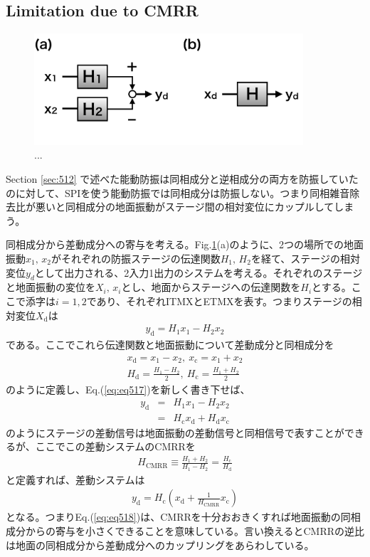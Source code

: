 \subsection{Limitation due to CMRR}
\begin{figure}[h]
  \begin{center}   
    \includegraphics[width=10cm]{./img_chap5/img510.png}
    \caption{...} \label{img:img510}
  \end{center}
\end{figure}
Section \cref{sec:512} で述べた能動防振は同相成分と逆相成分の両方を防振していたのに対して、SPIを使う能動防振では同相成分は防振しない。つまり同相雑音除去比が悪いと同相成分の地面振動がステージ間の相対変位にカップルしてしまう。

同相成分から差動成分への寄与を考える。Fig.\ref{img:img510}(a)のように、2つの場所での地面振動$x_1,\,x_2$がそれぞれの防振ステージの伝達関数$H_1,\,H_2$を経て、ステージの相対変位$y_d$として出力される、2入力1出力のシステムを考える。それぞれのステージと地面振動の変位を$X_{i},\,x_{i}$とし、地面からステージへの伝達関数を$H_{i}$とする。ここで添字は$i=1,2$であり、それぞれITMXとETMXを表す。つまりステージの相対変位$X_{\mathrm{d}}$は
\begin{eqnarray}
  y_{\mathrm{d}} = H_1x_1-H_2x_2 \label{eq:eq517}
\end{eqnarray}
である。ここでこれら伝達関数と地面振動について差動成分と同相成分を
\begin{eqnarray}
  x_{\mathrm{d}} = {x_1-x_2},\ x_{\mathrm{c}} = {x_1+x_2}  \\
  H_{\mathrm{d}} = \frac{H_1-H_2}{2},\ H_{\mathrm{c}} = \frac{H_1+H_2}{2}
\end{eqnarray}
のように定義し、Eq.(\ref{eq:eq517})を新しく書き下せば、
\begin{eqnarray}
  y_{\mathrm{d}} &=& H_1x_1-H_2x_2 \\
  &=& H_{\mathrm{c}}x_{\mathrm{d}} + H_{\mathrm{d}}x_{\mathrm{c}}\label{eq:eq516}
\end{eqnarray}
のようにステージの差動信号は地面振動の差動信号と同相信号で表すことができるが、ここでこの差動システムのCMRRを
\begin{eqnarray}
  H_{\mathrm{CMRR}} \equiv \frac{H_1+H_2}{H_1-H_2}=\frac{H_{\mathrm{c}}}{H_{\mathrm{d}}} \label{eq:eq519}
\end{eqnarray}
と定義すれば、差動システムは
\begin{eqnarray}
  y_{\mathrm{d}} = H_{\mathrm{c}}\left( x_{\mathrm{d}} + \frac{1}{H_{\mathrm{CMRR}}}x_{\mathrm{c}}\right) \label{eq:eq518}
\end{eqnarray}
となる。つまりEq.(\ref{eq:eq518})は、CMRRを十分おおきくすれば地面振動の同相成分からの寄与を小さくできることを意味している。言い換えるとCMRRの逆比は地面の同相成分から差動成分へのカップリングをあらわしている。

